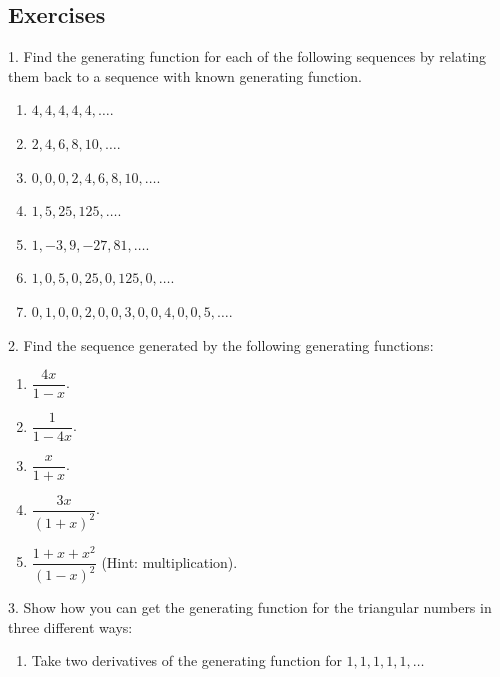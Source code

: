 \documentclass[10pt,]{book}
\theoremstyle{plain}
\theoremstyle{definition}
\theoremstyle{definition}
\theoremstyle{definition}
\numberwithin{equation}{chapter}
\begin{document}
\subsection[Exercises]{Exercises}\label{exercises-31}
\begin{exerciselist}
\item[1.]\hypertarget{exercise-322}{}
Find the generating function for each of the following sequences by relating them back to a sequence with known generating function.
%
\leavevmode%
\begin{enumerate}[label=(\alph*)]
\item\hypertarget{li-1318}{}\(4,4,4,4,4,\ldots\).%
\item\hypertarget{li-1319}{}\(2, 4, 6, 8, 10, \ldots\).%
\item\hypertarget{li-1320}{}\(0,0,0,2,4,6,8,10,\ldots\).%
\item\hypertarget{li-1321}{}\(1, 5, 25, 125, \ldots\).%
\item\hypertarget{li-1322}{}\(1, -3, 9, -27, 81, \ldots\).%
\item\hypertarget{li-1323}{}\(1, 0, 5, 0, 25, 0, 125, 0, \ldots\).%
\item\hypertarget{li-1324}{}\(0, 1, 0, 0, 2, 0, 0, 3, 0, 0, 4, 0, 0, 5, \ldots\).%
\end{enumerate}
\par\smallskip
\item[2.]\hypertarget{exercise-323}{}
Find the sequence generated by the following generating functions:
%
\leavevmode%
\begin{enumerate}[label=(\alph*)]
\item\hypertarget{li-1332}{}\(\dfrac{4x}{1-x}\).%
\item\hypertarget{li-1333}{}\(\dfrac{1}{1-4x}\).%
\item\hypertarget{li-1334}{}\(\dfrac{x}{1+x}\).%
\item\hypertarget{li-1335}{}\(\dfrac{3x}{(1+x)^2}\).%
\item\hypertarget{li-1336}{}\(\dfrac{1+x+x^2}{(1-x)^2}\) (Hint: multiplication).%
\end{enumerate}
\par\smallskip
\item[3.]\hypertarget{exercise-324}{}
Show how you can get the generating function for the triangular numbers in three different ways:
%
\leavevmode%
\begin{enumerate}[label=(\alph*)]
\item\hypertarget{li-1342}{}
Take two derivatives of the generating function for \(1,1,1,1,1, \ldots\)

\end{enumerate}
\end{exerciselist}
\end{document}
